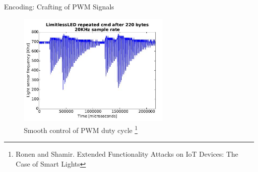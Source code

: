 \documentclass[11pt,t,usepdftitle=false,aspectratio=169]{beamer}
\begin{document}
\begin{frame}{Encoding: Crafting of PWM Signals}
    
    \begin{figure}
        \centering
        \includegraphics[height=5.5cm,keepaspectratio]{img/fast-flickering_limitlessLED.JPG}
        \caption{\small{Smooth control of PWM duty cycle \footnote{\tiny{Ronen and Shamir. Extended Functionality Attacks on IoT Devices: The Case of Smart Lights}}}}
    \end{figure}
    
     
\end{frame}

\end{document}
